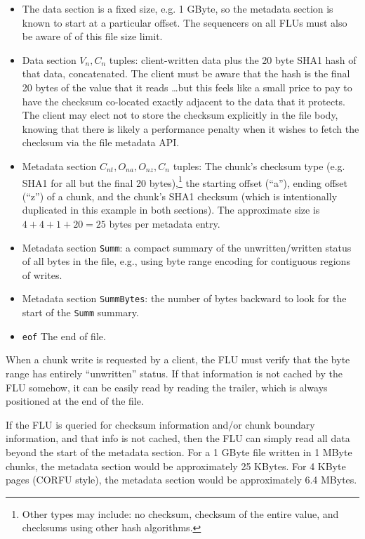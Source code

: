 \documentclass[preprint,10pt]{sigplanconf}
\begin{document}
\begin{itemize}
\item The data section is a fixed size, e.g. 1 GByte, so the metadata
  section is known to start at a particular offset.
  The sequencers on all FLUs must also be aware of of this file size
  limit.
\item Data section $V_n,C_n$ tuples: client-written data plus the 20
  byte SHA1 hash of that data, concatenated.  The client must be aware
  that the hash is the final 20 bytes of the value that it reads
  \ldots but this feels like a small price to pay to have the checksum
  co-located exactly adjacent to the data that it protects. 
  The client may elect not to store the checksum explicitly in the
  file body, knowing that there is likely a performance penalty when
  it wishes to fetch the checksum via the file metadata API.
\item Metadata section $C_{nt},O_{na},O_{nz},C_n$ tuples:
  The chunk's
  checksum type (e.g. SHA1 for all but the final
  20 bytes),\footnote{Other types may include: no checksum, checksum
    of the entire value, and checksums using other hash algorithms.}
  the starting
  offset (``a''), ending offset (``z'') of a chunk, and the
  chunk's SHA1 checksum (which is intentionally duplicated in this
  example in both sections).  The approximate size is
  $4 + 4 + 1 + 20 = 25$ bytes per metadata entry.
\item Metadata section {\tt Summ}: a compact summary of the
  unwritten/written status of all bytes in the file, e.g., using byte
  range encoding for contiguous regions of writes. 
\item Metadata section {\tt SummBytes}: the number of bytes backward
  to look for the start of the {\tt Summ} summary. 
\item {\tt eof} The end of file.
\end{itemize}

When a chunk write is requested by a client, the FLU must verify that
the byte range has entirely ``unwritten'' status.  If that information
is not cached by the FLU somehow, it can be easily read by reading the
trailer, which is always positioned at the end of the file.

If the FLU is queried for checksum information and/or chunk boundary
information, and that info is not cached, then the FLU can simply read
all data beyond the start of the metadata section.  For a 1 GByte file
written in 1 MByte chunks, the metadata section
would be approximately 25 KBytes.  For 4 KByte pages (CORFU style), the
metadata section would be approximately 6.4 MBytes.
\end{document}
